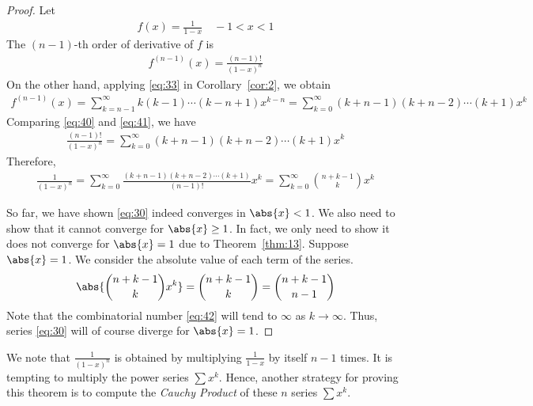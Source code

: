 \documentclass[thmcnt=section, 12pt]{elegantbook}
\begin{document}
\begin{proof}
    Let
    \begin{align*}
        f(x) = \frac{1}{1-x}
        \quad -1 < x < 1
    \end{align*}
    The $(n-1)$-th order of derivative of $f$ is 
    \begin{align}
        f^{(n-1)}(x) = \frac{(n-1)!}{(1-x)^{n}}
        \label{eq:40}
    \end{align}
    On the other hand, applying \eqref{eq:33} in Corollary~\ref{cor:2}, we obtain 
    \begin{align}
        f^{(n-1)}(x) = \sum_{k=n-1}^\infty k(k-1) \cdots (k-n+1) x^{k-n}
        = \sum_{k=0}^\infty (k+n-1)(k+n-2) \cdots (k+1) x^{k}
        \label{eq:41}
    \end{align}
    Comparing \eqref{eq:40} and \eqref{eq:41}, we have 
    \begin{align*}
        \frac{(n-1)!}{(1-x)^{n}}
        = \sum_{k=0}^\infty (k+n-1)(k+n-2) \cdots (k+1) x^{k}
    \end{align*}
    Therefore,
    \begin{align*}
        \frac{1}{(1-x)^{n}}
        = \sum_{k=0}^\infty \frac{(k+n-1)(k+n-2) \cdots (k+1)}{(n-1)!} x^{k}
        = \sum_{k=0}^\infty \binom{n+k-1}{k} x^{k}
    \end{align*}

    \par So far, we have shown \eqref{eq:30} indeed converges in $\abs{x} < 1$. We also need to show that it cannot converge for $\abs{x} \geq 1$. In fact, we only need to show it does not converge for $\abs{x} = 1$ due to Theorem~\ref{thm:13}. Suppose $\abs{x} = 1$. We consider the absolute value of each term of the series.
    \begin{align}
        \abs{\binom{n+k-1}{k} x^k}
        = \binom{n+k-1}{k}
        = \binom{n+k-1}{n-1}
        \label{eq:42}
    \end{align}
    Note that the combinatorial number \eqref{eq:42} will tend to $\infty$ as $k \to \infty$. Thus, series \eqref{eq:30} will of course diverge for $\abs{x} = 1$.
\end{proof}


\par We note that $\frac{1}{(1-x)^n}$ is obtained by multiplying $\frac{1}{1-x}$ by itself $n-1$ times. It is tempting to multiply the power series $\sum x^k$. Hence, another strategy for proving this theorem is to compute the \textit{Cauchy Product} of these $n$ series $\sum x^k$.
\end{document}
